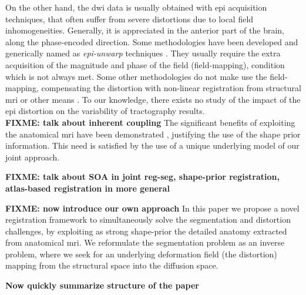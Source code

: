 On the other hand, the \ac{dwi} data is usually obtained with \ac{epi}
acquisition techniques, that often suffer from severe distortions due to 
local field inhomogeneities. Generally, it is appreciated in the anterior
part of the brain, along the phase-encoded direction. Some methodologies have
been developed and generically named as \emph{\ac{epi}-unwarp} techniques
\cite{holland_efficient_2010,hsu_correction_2009,jezzard_characterization_2005,
reber_correction_2005}. They usually 
require the extra acquisition of the magnitude and phase of
the field (field-mapping), condition which is not always met. Some other 
methodologies do not make use the field-mapping, compensating the distortion
with non-linear registration from structural \ac{mri} or other means
\citep{andersson_modeling_2001}. To our knowledge, there exists no study
of the impact of the \ac{epi} distortion on the variability of tractography
results. \\


\textbf{FIXME: talk about inherent coupling}
The significant benefits of exploiting the anatomical \ac{mri}
have been demonstrated \cite{zollei_improved_2010}, justifying the use
of the shape prior information. This need is satisfied by
the use of a unique underlying model of our joint approach.

\textbf{FIXME: talk about SOA in joint reg-seg, shape-prior registration, atlas-based registration in more general}
\citep{Chan2005,Bresson2006a,Cremers2006,Rousson2002,Schmid2008,Vemuri2003a,Gastaud2004,McInerney1996,Chan,Paragios2003,Ayvaci2007,Pohl2005,Wyatt2003,Yezzi2003,Wang2006,Soatto2002,Yezzi2001,Pohl2006,Chen2002,le_guyader_combined_2011}




\textbf{FIXME: now introduce our own approach}
In this paper we propose a novel registration framework to simultaneously
solve the segmentation and distortion challenges, by exploiting as strong 
shape-prior the detailed anatomy extracted from anatomical \ac{mri}. 
We reformulate the segmentation problem as an inverse problem, where
we seek for an underlying deformation field (the distortion) mapping 
from the structural space into the diffusion space.

\textbf{Now quickly summarize structure of the paper}